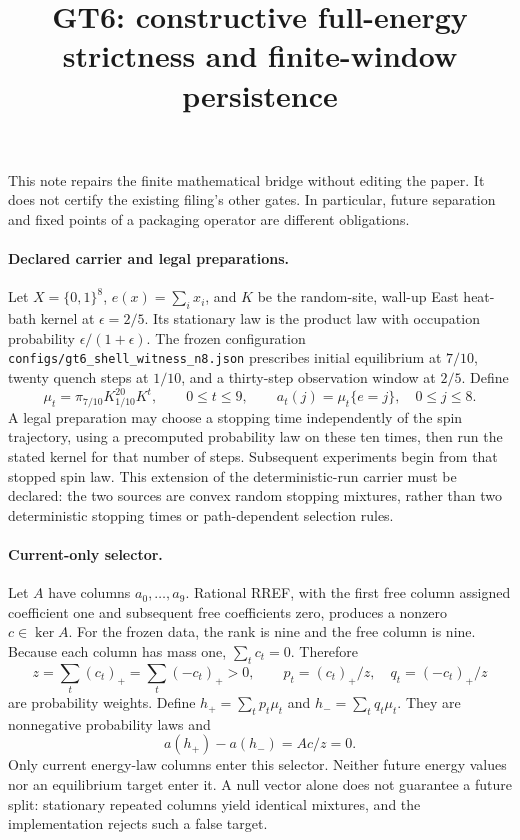 \documentclass{article}
\begin{document}
\title{GT6: constructive full-energy strictness and finite-window persistence}
\author{}
\date{}
\maketitle

This note repairs the finite mathematical bridge without editing the paper.
It does not certify the existing filing's other gates. In particular, future
separation and fixed points of a packaging operator are different obligations.

\paragraph{Declared carrier and legal preparations.}
Let $X=\{0,1\}^8$, $e(x)=\sum_i x_i$, and $K$ be the random-site, wall-up East
heat-bath kernel at $\epsilon=2/5$. Its stationary law is the product law with
occupation probability $\epsilon/(1+\epsilon)$. The frozen configuration
\texttt{configs/gt6\_shell\_witness\_n8.json} prescribes initial equilibrium
at $7/10$, twenty quench steps at $1/10$, and a thirty-step observation window
at $2/5$. Define
\[
 \mu_t=\pi_{7/10} K_{1/10}^{20} K^t,\qquad 0\leq t\leq9,
 \qquad a_t(j)=\mu_t\{e=j\},\quad 0\leq j\leq8.
\]
A legal preparation may choose a stopping time independently of the spin
trajectory, using a precomputed probability law on these ten times, then run
the stated kernel for that number of steps. Subsequent experiments begin from
that stopped spin law. This extension of the deterministic-run carrier must
be declared: the two sources are convex random stopping mixtures, rather
than two deterministic stopping times or path-dependent selection rules.

\paragraph{Current-only selector.}
Let $A$ have columns $a_0,\ldots,a_9$. Rational RREF, with the first free
column assigned coefficient one and subsequent free coefficients zero,
produces a nonzero $c\in\ker A$. For the frozen data, the rank is nine and
the free column is nine. Because each column has mass one,
$\sum_t c_t=0$. Therefore
\[
 z=\sum_t(c_t)_+=\sum_t(-c_t)_+>0,\qquad
 p_t=(c_t)_+/z,\quad q_t=(-c_t)_+/z
\]
are probability weights. Define $h_+=\sum_t p_t\mu_t$ and
$h_-=\sum_t q_t\mu_t$. They are nonnegative probability laws and
\[
 a(h_+)-a(h_-)=Ac/z=0.
\]
Only current energy-law columns enter this selector. Neither future energy
values nor an equilibrium target enter it. A null vector alone does not
guarantee a future split: stationary repeated columns yield identical
mixtures, and the implementation rejects such a false target.
\end{document}
